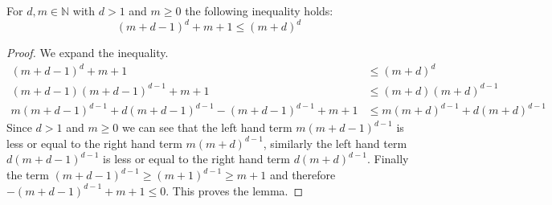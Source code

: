 
\begin{lemma}
	\label{lem_md_ineq}
	For $d,m \in \mathbb{N}$ with $d>1$ and $m \geq 0$ the following inequality holds:
	\[ (m+d-1)^d + m+1 \leq (m+d)^d \]
	\begin{proof}
		We expand the inequality.
		\begin{align*}
		(m+d-1)^d + m + 1 & \leq (m+d)^d\\
		(m+d-1)(m+d-1)^{d-1} + m + 1 & \leq (m+d)(m+d)^{d-1}\\
		m(m+d-1)^{d-1} + d(m+d-1)^{d-1} - (m+d-1)^{d-1} + m + 1 & \leq m(m+d)^{d-1} + d(m+d)^{d-1}
		\end{align*}
		Since $d > 1$ and $m \geq 0$ we can see that the left hand term $m(m+d-1)^{d-1}$ is less or equal to the right hand term $m(m+d)^{d-1}$, similarly the left hand term $d(m+d-1)^{d-1}$ is less or equal to the right hand term $d(m+d)^{d-1}$. Finally the term $(m+d-1)^{d-1} \geq (m+1)^{d-1} \geq m+1$ and therefore $- (m+d-1)^{d-1} + m + 1  \leq 0$. This proves the lemma.
	\end{proof}
\end{lemma}